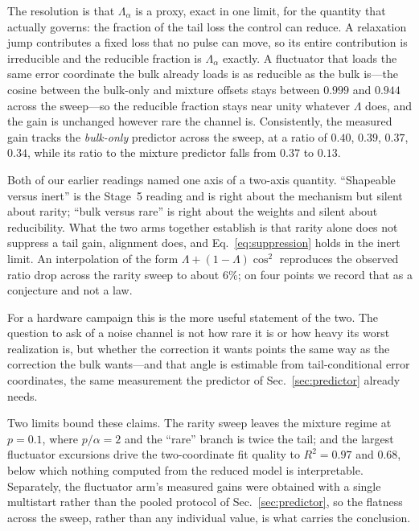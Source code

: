 \documentclass[aps,pra,twocolumn,superscriptaddress,reprint,nofootinbib,floatfix]{revtex4-2}
\theoremstyle{definition}
\begin{document}
The resolution is that $\Lambda_\alpha$ is a proxy, exact in one limit, for
the quantity that actually governs: the fraction of the tail loss the control
can reduce. A relaxation jump contributes a fixed loss that no pulse can
move, so its entire contribution is irreducible and the reducible fraction is
$\Lambda_\alpha$ exactly. A fluctuator that loads the same error coordinate
the bulk already loads is as reducible as the bulk is---the cosine between
the bulk-only and mixture offsets stays between $0.999$ and $0.944$ across
the sweep---so the reducible fraction stays near unity whatever $\Lambda$
does, and the gain is unchanged however rare the channel is. Consistently,
the measured gain tracks the \emph{bulk-only} predictor across the sweep, at
a ratio of $0.40$, $0.39$, $0.37$, $0.34$, while its ratio to the mixture
predictor falls from $0.37$ to $0.13$.

Both of our earlier readings named one axis of a two-axis quantity.
``Shapeable versus inert'' is the Stage~5 reading and is right about the
mechanism but silent about rarity; ``bulk versus rare'' is right about the
weights and silent about reducibility. What the two arms together establish
is that rarity alone does not suppress a tail gain, alignment does, and
Eq.~\eqref{eq:suppression} holds in the inert limit. An interpolation of the
form $\Lambda + (1-\Lambda)\cos^2$ reproduces the observed ratio drop across
the rarity sweep to about $6\%$; on four points we record that as a
conjecture and not a law.

For a hardware campaign this is the more useful statement of the two. The
question to ask of a noise channel is not how rare it is or how heavy its
worst realization is, but whether the correction it wants points the same way
as the correction the bulk wants---and that angle is estimable from
tail-conditional error coordinates, the same measurement the predictor of
Sec.~\ref{sec:predictor} already needs.

Two limits bound these claims. The rarity sweep leaves the mixture regime at
$p=0.1$, where $p/\alpha=2$ and the ``rare'' branch is twice the tail; and
the largest fluctuator excursions drive the two-coordinate fit quality to
$R^2=0.97$ and $0.68$, below which nothing computed from the reduced model is
interpretable. Separately, the fluctuator arm's measured gains were obtained
with a single multistart rather than the pooled protocol of
Sec.~\ref{sec:predictor}, so the flatness across the sweep, rather than any
individual value, is what carries the conclusion.
\end{document}
